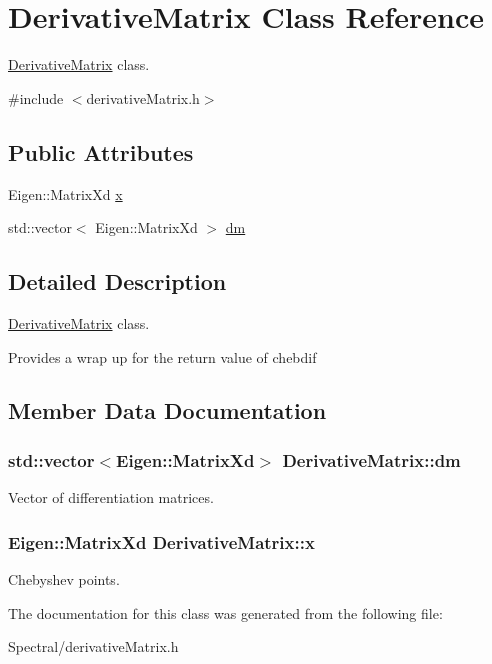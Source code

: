 \hypertarget{class_derivative_matrix}{\section{Derivative\+Matrix Class Reference}
\label{class_derivative_matrix}
}


\hyperlink{class_derivative_matrix}{Derivative\+Matrix} class.  




{\ttfamily \#include $<$derivative\+Matrix.\+h$>$}

\subsection*{Public Attributes}
\begin{DoxyCompactItemize}
\item 
Eigen\+::\+Matrix\+Xd \hyperlink{class_derivative_matrix_a295659c0ca0a324e3faf27896c837a32}{x}
\item 
std\+::vector$<$ Eigen\+::\+Matrix\+Xd $>$ \hyperlink{class_derivative_matrix_affec4e9648c333e1f2bcb7b5619a0dab}{dm}
\end{DoxyCompactItemize}


\subsection{Detailed Description}
\hyperlink{class_derivative_matrix}{Derivative\+Matrix} class. 

Provides a wrap up for the return value of chebdif 

\subsection{Member Data Documentation}
\hypertarget{class_derivative_matrix_affec4e9648c333e1f2bcb7b5619a0dab}{
\subsubsection[{dm}]{\setlength{\rightskip}{0pt plus 5cm}std\+::vector$<$Eigen\+::\+Matrix\+Xd$>$ Derivative\+Matrix\+::dm}}\label{class_derivative_matrix_affec4e9648c333e1f2bcb7b5619a0dab}
Vector of differentiation matrices. \hypertarget{class_derivative_matrix_a295659c0ca0a324e3faf27896c837a32}{
\subsubsection[{x}]{\setlength{\rightskip}{0pt plus 5cm}Eigen\+::\+Matrix\+Xd Derivative\+Matrix\+::x}}\label{class_derivative_matrix_a295659c0ca0a324e3faf27896c837a32}
Chebyshev points. 

The documentation for this class was generated from the following file\+:\begin{DoxyCompactItemize}
\item 
Spectral/derivative\+Matrix.\+h\end{DoxyCompactItemize}
